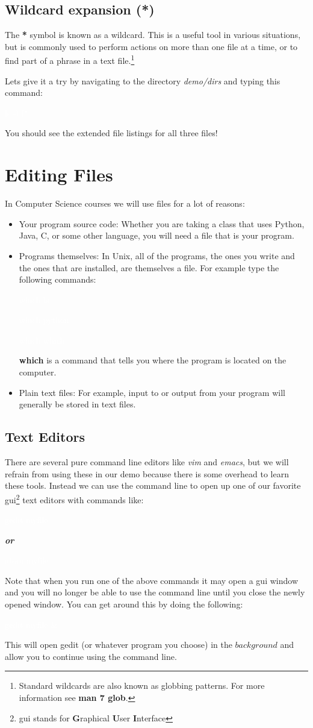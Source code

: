 \documentclass[oneside]{book}
\newcommand{\commandline}[1]{\begin{center} \colorbox{Dark}{\textcolor{white}{#1}} \end{center}}
\begin{document}
\subsection{Wildcard expansion (*)}
The \textbf{*} symbol is known as a wildcard. This is a useful tool in various situations, but is commonly used to perform actions on more than one file at a time, or to find part of a phrase in a text file.\footnote{Standard wildcards are also known as globbing patterns. For more information see \textbf{man 7 glob}.} 

Lets give it a try by navigating to the directory \textit{demo/dirs} and typing this command:
\commandline{ls -l f*}

You should see the extended file listings for all three files!

\section{Editing Files}
 In Computer Science courses we will use files for a lot of reasons:
\begin{itemize}
	\item Your program source code: Whether you are taking a class that uses Python, Java, C, or some other language, you will need a file that is your program.
	\item Programs themselves: In Unix, all of the programs, the ones you write and the ones that are installed, are themselves a file. For example type the following commands:
		\commandline{which ls}
		\commandline{which python}
		\commandline{which which}
	\textbf{which} is a command that tells you where the program is located on the computer. 
	\item Plain text files: For example, input to or output from your program will generally be stored in text files. 
\end{itemize}


\subsection{Text Editors}
There are several pure command line editors like \textit{vim} and \textit{emacs}, but we will refrain from using these in our demo because there is some overhead to learn these tools. Instead we can use the command line to open up one of our favorite gui\footnote{gui stands for \textbf{G}raphical \textbf{U}ser \textbf{I}nterface} text editors with commands like: 
\commandline{gedit myfile}
\begin{center}
    \textbf{\textit{or}}
\end{center}
\commandline{atom myfile}
Note that when you run one of the above commands it may open a gui window and you will no longer be able to use the command line until you close the newly opened window. You can get around this by doing the following:
\commandline{gedit myfile \&}
This will open gedit (or whatever program you choose) in the $background$ and allow you to continue using the command line. \\
\end{document}
